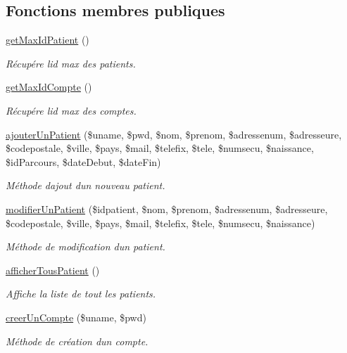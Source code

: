 \subsection*{Fonctions membres publiques}
\begin{DoxyCompactItemize}
\item 
\hyperlink{class_m___patient_ae78fc7c3ec0e22745e48533c903ecd04}{get\+Max\+Id\+Patient} ()
\begin{DoxyCompactList}\small\item\em Récupére l\textquotesingle{}id max des patients. \end{DoxyCompactList}\item 
\hyperlink{class_m___patient_ad46c826cf873513020c2a38c4955f55c}{get\+Max\+Id\+Compte} ()
\begin{DoxyCompactList}\small\item\em Récupére l\textquotesingle{}id max des comptes. \end{DoxyCompactList}\item 
\hyperlink{class_m___patient_aa84f7a3be1a139c0392af7f48ba5de9f}{ajouter\+Un\+Patient} (\$uname, \$pwd, \$nom, \$prenom, \$adressenum, \$adresseure, \$codepostale, \$ville, \$pays, \$mail, \$telefix, \$tele, \$numsecu, \$naissance, \$id\+Parcours, \$date\+Debut, \$date\+Fin)
\begin{DoxyCompactList}\small\item\em Méthode d\textquotesingle{}ajout d\textquotesingle{}un nouveau patient. \end{DoxyCompactList}\item 
\hyperlink{class_m___patient_af56fef6b964aea361b041c9cbadf7883}{modifier\+Un\+Patient} (\$idpatient, \$nom, \$prenom, \$adressenum, \$adresseure, \$codepostale, \$ville, \$pays, \$mail, \$telefix, \$tele, \$numsecu, \$naissance)
\begin{DoxyCompactList}\small\item\em Méthode de modification d\textquotesingle{}un patient. \end{DoxyCompactList}\item 
\hyperlink{class_m___patient_a052c759daf4e12f106ad1f87918dd3e1}{afficher\+Tous\+Patient} ()
\begin{DoxyCompactList}\small\item\em Affiche la liste de tout les patients. \end{DoxyCompactList}\item 
\hyperlink{class_m___patient_a2b41b0d0ce073bf55991a632e0206b3e}{creer\+Un\+Compte} (\$uname, \$pwd)
\begin{DoxyCompactList}\small\item\em Méthode de création d\textquotesingle{}un compte. \end{DoxyCompactList}\item 

\end{DoxyCompactItemize}
